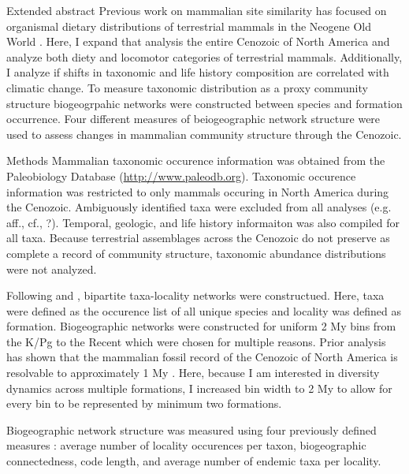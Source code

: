 \documentclass[final]{beamer}\usepackage[]{graphicx}\usepackage[]{color}
\newlength{\onecolwid}
\begin{document}
\begin{frame}[t]
\begin{columns}[t]
\begin{column}{\onecolwid}
\begin{block}{Extended abstract}
        Previous work on mammalian site similarity has focused on organismal dietary distributions of terrestrial mammals in the Neogene Old World \citep{Jernvall2002,Jernvall2004}. 
        Here, I expand that analysis the entire Cenozoic of North America and analyze both diety and locomotor categories of terrestrial mammals. Additionally, I analyze if shifts in taxonomic and life history composition are correlated with climatic change.
        To measure taxonomic distribution as a proxy community structure biogeogrpahic networks were constructed between species and formation occurrence. Four different measures of beiogeographic network structure were used to assess changes in mammalian community structure through the Cenozoic.
      \end{block}

      \begin{footnotesize}
      \begin{block}{Methods}
        Mammalian taxonomic occurence information was obtained from the Paleobiology Database (\url{http://www.paleodb.org}). Taxonomic occurence information was restricted to only mammals occuring in North America during the Cenozoic. Ambiguously identified taxa were excluded from all analyses (e.g. aff., cf., ?). Temporal, geologic, and life history informaiton was also compiled for all taxa. Because terrestrial assemblages across the Cenozoic do not preserve as complete a record of community structure, taxonomic abundance distributions were not analyzed.

        Following \citet{Sidor2013} and \citet{Vilhena2013}, bipartite taxa-locality networks were constructued. Here, taxa were defined as the occurence list of all unique species and locality was defined as formation. Biogeographic networks were constructed for uniform 2 My bins from the K/Pg to the Recent which were chosen for multiple reasons. Prior analysis has shown that the mammalian fossil record of the Cenozoic of North America is resolvable to approximately 1 My \citep{Alroy1996a,Alroy2000g}. Here, because I am interested in diversity dynamics across multiple formations, I increased bin width to 2 My to allow for every bin to be represented by minimum two formations.

        Biogeographic network structure was measured using four previously defined measures \citep{Sidor2013}: average number of locality occurences per taxon, biogeographic connectedness, code length, and average number of endemic taxa per locality. 


\end{block}
\end{footnotesize}
\end{column}
\end{columns}
\end{frame}
\end{document}
